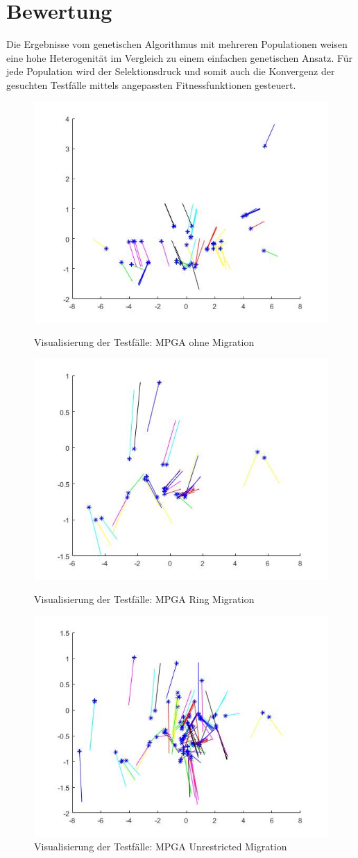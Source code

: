 \documentclass[12pt,a4paper]{article}
\begin{document}
\section{Bewertung}
Die Ergebnisse vom genetischen Algorithmus mit mehreren Populationen weisen eine hohe Heterogenität im Vergleich zu einem einfachen genetischen Ansatz. Für jede Population wird der Selektionsdruck und somit auch die Konvergenz der gesuchten Testfälle mittels angepassten Fitnessfunktionen gesteuert.
\begin{figure}\centering
\includegraphics[width=.6\textwidth]{mpga_nomigration.jpg}
\caption{Visualisierung der Testfälle: MPGA ohne Migration}
\label{fig:mpganomig}
\includegraphics[width=.6\textwidth]{mpga_ring.jpg}
\caption{Visualisierung der Testfälle: MPGA Ring Migration}
\label{fig:mpgaring}
\includegraphics[width=.6\textwidth]{mpga_unrestricted.jpg}
\caption{Visualisierung der Testfälle: MPGA Unrestricted Migration}
\label{fig:mpgaunrest}

\end{figure}
\end{document}
